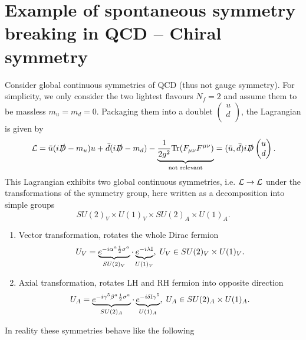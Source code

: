 \section{Example of spontaneous symmetry breaking in QCD -- Chiral symmetry}
Consider global continuous symmetries of QCD (thus not gauge symmetry). For simplicity, we only consider the two lightest flavours $N_f =2$ and assume them to be massless $m_u=m_d=0$. Packaging them into a doublet $\begin{pmatrix}
u \\
d\\
\end{pmatrix}$, the Lagrangian is given by
\begin{equation}
	\mathcal{L}= \bar{ u} (i \slashed{D} -m_u) u+ \bar{ d} (i \slashed{D} - m_d) -\underbrace{ \frac{1}{2 g^2} \mathrm{Tr} (F_{\mu \nu} F^{\mu \nu})}_{\text{not relevant}} = (\bar{u}, \bar{d}) i \slashed{D} \begin{pmatrix}
	u\\
	d\\
	\end{pmatrix}.
\end{equation}
This Lagrangian exhibits two global continuous symmetries, i.e. $\mathcal{L} \rightarrow \mathcal{L}$ under the transformations of the symmetry group, here written as a decomposition into simple groups
\begin{equation}
	SU(2)_V\times U(1)_V \times SU(2)_A \times U(1)_A.
\end{equation}
\begin{enumerate}
	\item Vector transformation, rotates the whole Dirac fermion
	\begin{equation}
		U_V = \underbrace{e^{-i \alpha^a \frac{1}{2} \sigma^a}}_{SU(2)_V} \cdot \underbrace{e^{-i \lambda \mathbb{I}}}_{U(1)_V}, \; U_V \in SU(2)_V \times U(1)_V.
	\end{equation}
	\item Axial transformation, rotates LH and RH fermion into opposite direction
	\begin{equation}
		U_A = \underbrace{e^{-i\gamma^5 \beta^a \frac{1}{2} \sigma^a}}_{SU(2)_A} \cdot \underbrace{e^{-i\delta \mathbb{I} \gamma^5}}_{U(1)_A}, \; U_A \in SU(2)_A\times U(1)_A. 
	\end{equation}
\end{enumerate}
In reality these symmetries behave like the following
